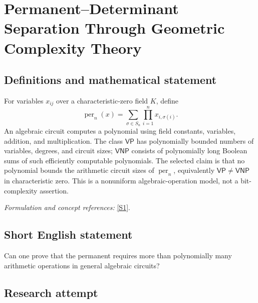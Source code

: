 \documentclass[11pt,a4paper]{article}
\newcommand{\sref}[2]{\hyperlink{source:#1:#2}{[S#2]}}
\newif\ifshowcatalogue
\newcommand{\cataloguescope}[1]{\ifshowcatalogue
 \paragraph{Exact scope in the supplied catalogue.}
 \begin{quote}\small #1\end{quote}\fi}
\numberwithin{equation}{section}
\begin{document}
\setcounter{section}{0}
\clearpage
\section*{\texorpdfstring{Permanent–Determinant Separation Through Geometric Complexity Theory}{Permanent–Determinant Separation Through Geometric Complexity Theory}}\label{statement}
\subsection{Definitions and mathematical statement}
For variables $x_{ij}$ over a characteristic-zero field $K$, define
\[
 \operatorname{per}_n(x)=\sum_{\sigma\in S_n}\prod_{i=1}^n x_{i,\sigma(i)}.
\]
An algebraic circuit computes a polynomial using field constants, variables, addition, and multiplication. The class $\mathsf{VP}$ has polynomially bounded numbers of variables, degrees, and circuit sizes; $\mathsf{VNP}$ consists of polynomially long Boolean sums of such efficiently computable polynomials. The selected claim is that no polynomial bounds the arithmetic circuit sizes of $\operatorname{per}_n$, equivalently $\mathsf{VP}\ne\mathsf{VNP}$ in characteristic zero. This is a nonuniform algebraic-operation model, not a bit-complexity assertion.
\par\smallskip\textit{Formulation and concept references:} \sref{statement}{1}.
\cataloguescope{Prove that the permanent polynomial family cannot be computed by polynomial-size algebraic circuits over fields of characteristic zero, equivalently that VP is not equal to VNP.}
\subsection{Short English statement}
Can one prove that the permanent requires more than polynomially many arithmetic operations in general algebraic circuits?
\subsection{Research attempt}
\end{document}
